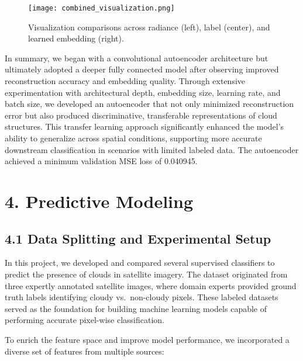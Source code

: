 \documentclass[11pt]{article}
\begin{document}
\begin{figure}[htbp]
    \centering
    \texttt{[image: combined\_visualization.png]}
    \caption{Visualization comparisons across radiance (left), label (center), and learned embedding (right).}
    \label{fig:combined-visualizations}
\end{figure}

In summary, we began with a convolutional autoencoder architecture but
ultimately adopted a deeper fully connected model after observing
improved reconstruction accuracy and embedding quality. Through
extensive experimentation with architectural depth, embedding size,
learning rate, and batch size, we developed an autoencoder that not only
minimized reconstruction error but also produced discriminative,
transferable representations of cloud structures. This transfer learning
approach significantly enhanced the model's ability to generalize across
spatial conditions, supporting more accurate downstream classification
in scenarios with limited labeled data. The autoencoder achieved a minimum validation MSE loss of 0.040945.

\section*{4. Predictive Modeling}\label{predictive-modeling}

\subsection*{4.1 Data Splitting and Experimental
Setup}\label{data-splitting-and-experimental-setup}

In this project, we developed and compared several supervised
classifiers to predict the presence of clouds in satellite imagery. The
dataset originated from three expertly annotated satellite images, where
domain experts provided ground truth labels identifying cloudy
vs.~non-cloudy pixels. These labeled datasets served as the foundation
for building machine learning models capable of performing accurate
pixel-wise classification.

To enrich the feature space and improve model performance, we
incorporated a diverse set of features from multiple sources:
\end{document}
